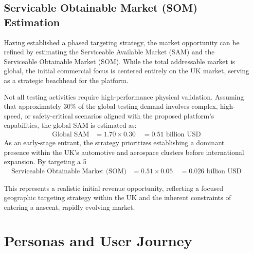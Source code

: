 \subsection{Servicable Obtainable Market (SOM) Estimation}
\label{subsec:som_estimation}

Having established a phased targeting strategy, the market opportunity can be refined by estimating the Serviceable Available Market (SAM) and the Serviceable Obtainable Market (SOM). While the total addressable market is global, the initial commercial focus is centered entirely on the UK market, serving as a strategic beachhead for the platform.

Not all testing activities require high-performance physical validation. Assuming that approximately 30\% of the global testing demand involves complex, high-speed, or safety-critical scenarios aligned with the proposed platform’s capabilities, the global SAM is estimated as:
\vspace{-3pt}
\begin{equation}
\begin{aligned}
\text{Global SAM} &= 1.70 \times 0.30 \
&= 0.51 \text{ billion USD}
\end{aligned}
\end{equation}
\vspace{+4pt}
As an early-stage entrant, the strategy prioritizes establishing a dominant presence within the UK's automotive and aerospace clusters before international expansion. By targeting a 5%
\vspace{-3pt}
\begin{equation}
\begin{aligned}
\text{Serviceable Obtainable Market (SOM)} &= 0.51 \times 0.05 \
&= 0.026 \text{ billion USD}
\end{aligned}
\end{equation}
\vspace{-18pt}

This represents a realistic initial revenue opportunity, reflecting a focused geographic targeting strategy within the UK and the inherent constraints of entering a nascent, rapidly evolving market.

\section{Personas and User Journey}
\label{sec:personas}

